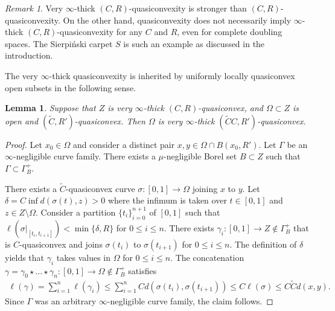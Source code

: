 \documentclass[reqno]{amsart}
\numberwithin{equation}{section}
\newtheorem{lemma}[theorem]{Lemma}
\theoremstyle{remark}
\newtheorem{remark}[theorem]{Remark}
\begin{document}
\begin{remark}\label{rem:verythick-to-thick}
Very $\infty$-thick $( C, R )$-quasiconvexity is stronger than $( C, R )$-quasiconvexity. On the other hand, quasiconvexity does not necessarily imply $\infty$-thick $( C, R )$-quasiconvexity for any $C$ and $R$, even for complete doubling spaces. The Sierpi\'nski carpet $S$ is such an example as discussed in the introduction. 
\end{remark}

The very $\infty$-thick quasiconvexity is inherited by uniformly locally quasiconvex open subsets in the following sense.
\begin{lemma}\label{lem:thick-to-verythick}
Suppose that $Z$ is very $\infty$-thick $(C,R)$-quasiconvex, and $\Omega \subset Z$ is open and $( \widetilde{C}, R' )$-quasiconvex. Then $\Omega$ is very $\infty$-thick $( \widetilde{C}C, R' )$-quasiconvex.
\end{lemma}
\begin{proof}
Let $x_0 \in \Omega$ and consider a distinct pair $x, y \in \Omega \cap B( x_0, R' )$. Let $\Gamma$ be an $\infty$-negligible curve family. There exists a $\mu$-negligible Borel set $B \subset Z$ such that $\Gamma \subset \Gamma^{+}_{B}$.

There exists a $\widetilde{C}$-quasiconvex curve $\sigma \colon [0,1] \rightarrow \Omega$ joining $x$ to $y$. Let $\delta = C \inf d( \sigma(t), z ) > 0$ where the infimum is taken over $t \in [0,1]$ and $z \in Z \setminus \Omega$. Consider a partition $\{ t_i \}_{ i = 0 }^{ n+1 }$ of $[0,1]$ such that $\ell( \sigma|_{ [t_i, t_{i+1}] } ) < \min\{ \delta, R \}$ for $0 \leq i \leq n$. There exists $\gamma_i \colon [0,1] \rightarrow Z \not\in \Gamma^{+}_{B}$ that is $C$-quasiconvex and joins $\sigma( t_i )$ to $\sigma( t_{i+1} )$ for $0 \leq i \leq n$. The definition of $\delta$ yields that $\gamma_i$ takes values in $\Omega$ for $0 \leq i \leq n$. The concatenation $\gamma = \gamma_0 \star \dots \star \gamma_{n} \colon [0,1] \rightarrow \Omega \not\in \Gamma^{+}_{B}$ satisfies
\begin{align*}
    \ell( \gamma )
    =
    \sum_{ i = 1 }^{ n } \ell( \gamma_i )
    \leq
    \sum_{ i = 1 }^{ n } C d( \sigma( t_i ), \sigma( t_{i+1} ) )
    \leq
    C \ell( \sigma )
    \leq
    C \widetilde{C} d( x, y ).
\end{align*}
Since $\Gamma$ was an arbitrary $\infty$-negligible curve family, the claim follows.
\end{proof}
\end{document}
